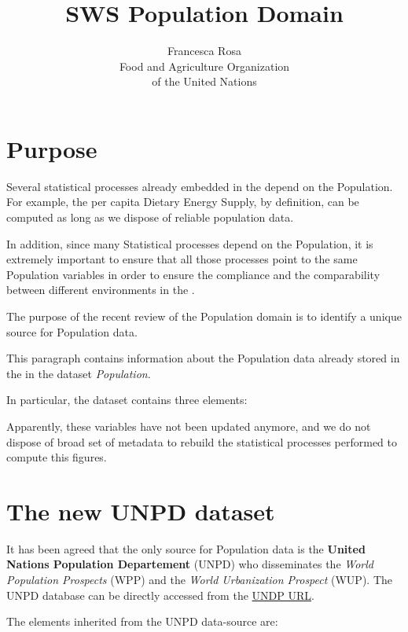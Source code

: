 \documentclass[nojss]{jss}\usepackage[]{graphicx}\usepackage[]{color}
\title{\bf{SWS Population Domain} }
\author{Francesca Rosa\\ Food and Agriculture
    Organization \\ of the United Nations\\}
\begin{document}
\section{Purpose}
Several statistical processes already embedded in the  depend on the Population. For example, the per capita Dietary Energy Supply, by definition, can be computed as long as we dispose of reliable population data.

In addition, since many Statistical processes depend on the Population, it is extremely important to ensure that all those processes point to the same Population variables in order to ensure the compliance and the comparability between different environments in the .


The purpose of the recent review of the Population domain is to identify a unique source for Population data.

This paragraph contains information about the Population data already stored in the  in the dataset \textit{Population}.

In particular, the dataset  contains three elements:

\begin{itemize}
\item{\textit{Total Population} []}
\item{\textit{Food balance sheets population},  [\code{element-code 21]}
\item{\textit{Weighted Total Population},  [\code{element-code 511]}
\end{itemize}

Apparently, these variables have not been updated anymore, and we do not dispose of broad set of metadata to rebuild the statistical processes performed to compute this figures.


\section{The new UNPD dataset}

It has been agreed that the only source for Population data is the \textbf{United Nations Population Departement} (UNPD) who disseminates the \textit{World Population Prospects} (WPP) and the \textit{World Urbanization Prospect} (WUP).
The UNPD database can be directly accessed from the \href{http://www.un.org/en/development/desa/population/publications/database/index.shtml}{UNDP URL}.


The elements inherited from the UNPD data-source are:
\end{document}
